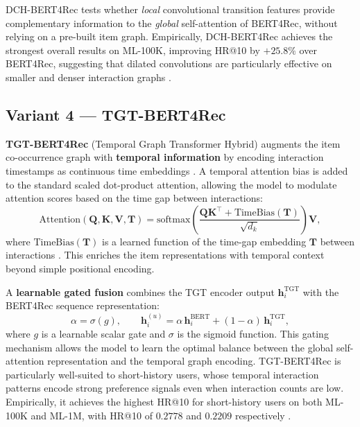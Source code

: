\documentclass[12pt,a4paper]{report}
\newcommand{\parencite}[1]{\citep{#1}}
\begin{document}
DCH-BERT4Rec tests whether \textit{local} convolutional transition
features provide complementary information to the \textit{global}
self-attention of BERT4Rec, without relying on a pre-built item
graph. Empirically, DCH-BERT4Rec achieves the strongest overall
results on ML-100K, improving HR@10 by $+25.8\%$ over BERT4Rec,
suggesting that dilated convolutions are particularly effective
on smaller and denser interaction graphs
\parencite{ouledmeriem2025hybrid}.

\subsection{Variant 4 — TGT-BERT4Rec}

\textbf{TGT-BERT4Rec} (Temporal Graph Transformer Hybrid)
augments the item co-occurrence graph with \textbf{temporal
information} by encoding interaction timestamps as continuous
time embeddings \parencite{ouledmeriem2025hybrid}. A temporal
attention bias is added to the standard scaled dot-product
attention, allowing the model to modulate attention scores
based on the time gap between interactions:
\begin{equation}
  \text{Attention}(\mathbf{Q}, \mathbf{K}, \mathbf{V}, \mathbf{T}) =
    \text{softmax}\!\left(
      \frac{\mathbf{Q}\mathbf{K}^\top + \text{TimeBias}(\mathbf{T})}
           {\sqrt{d_k}}
    \right) \mathbf{V},
\end{equation}
where $\text{TimeBias}(\mathbf{T})$ is a learned function of the
time-gap embedding $\mathbf{T}$ between interactions
\parencite{ouledmeriem2025hybrid}. This enriches the item
representations with temporal context beyond simple positional
encoding.

A \textbf{learnable gated fusion} combines the TGT encoder output
$\mathbf{h}_i^{\text{TGT}}$ with the BERT4Rec sequence
representation:
\begin{equation}
  \alpha = \sigma(g), \qquad
  \mathbf{h}_i^{(u)} = \alpha\, \mathbf{h}_i^{\text{BERT}}
                      + (1 - \alpha)\, \mathbf{h}_i^{\text{TGT}},
\end{equation}
where $g$ is a learnable scalar gate and $\sigma$ is the sigmoid
function. This gating mechanism allows the model to learn the
optimal balance between the global self-attention representation
and the temporal graph encoding. TGT-BERT4Rec is particularly
well-suited to short-history users, whose temporal interaction
patterns encode strong preference signals even when interaction
counts are low. Empirically, it achieves the highest HR@10 for
short-history users on both ML-100K and ML-1M, with HR@10 of
$0.2778$ and $0.2209$ respectively
\parencite{ouledmeriem2025hybrid}.
\end{document}
